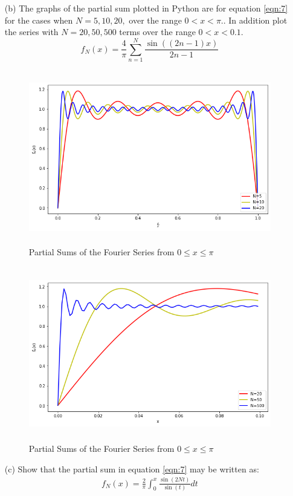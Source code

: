 \documentclass[12pt,a4paper]{article}
\begin{document}
\begin{enumerate}
	\item[(b)] The graphs of the partial sum plotted in Python are  for equation \eqref{eqn:7}  for the cases when
	$N= 5,10,20,$ over the range $0< x < \pi. $. In addition plot the series with $N= 20,50,500 $
	terms over the range $0< x <0.1$.
	   \begin{equation}
			\label{eqn:7}
		f_N(x)=\frac{4}{\pi}\sum_{n=1}^{N}\frac{\sin((2n-1)x)}{2n-1}
	\end{equation}
	\begin{figure}[!h]
			\includegraphics[width=430pt,  height=215pt]{./graphics/q3b1.png}
			\caption{Partial Sums of the Fourier Series from $0  \leq x  \leq \pi$}
		\end{figure}
			\begin{figure}[!h]
			\includegraphics[width=430pt,  height=215pt]{./graphics/q3b2.png}
			\caption{Partial Sums of the Fourier Series from $0  \leq x  \leq \pi$}
		\end{figure}
	\item[(c)] Show that the partial sum in equation \ref{eqn:7} may be written as:
\begin{align*}
f_N(x)=\frac{2}{\pi}\int_{0}^{x}\frac{\sin (2N t)}{\sin (t)}dt
\end{align*}


\end{enumerate}
\end{document}
